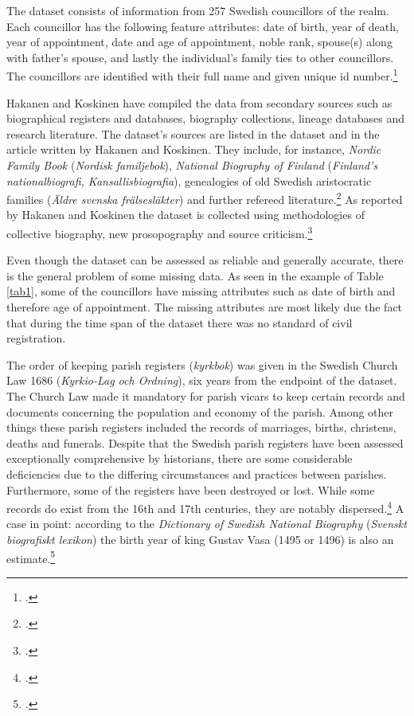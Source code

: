 The dataset consists of information from 257 Swedish councillors of the realm. Each councillor has the following feature attributes: date of birth, year of death, year of appointment, date and age of appointment, noble rank, spouse(s) along with father's spouse, and lastly the individual's family ties to other councillors. The councillors are identified with their full name and given unique id number.\footcites[p. 48.]{HakanenAKoskinen2017}{councillorsDS}

Hakanen and Koskinen have compiled the data from secondary sources such as biographical registers and databases, biography collections, lineage databases and research literature. The dataset's sources are listed in the dataset and in the article written by Hakanen and Koskinen. They include, for instance, \textit{Nordic Family Book} (\textit{Nordisk familjebok}), \textit{National Biography of Finland} (\textit{Finland's nationalbiografi, Kansallisbiografia}), genealogies of old Swedish aristocratic families (\textit{Äldre svenska frälsesläkter}) and further refereed literature.\footcites[p. 48, 76]{HakanenAKoskinen2017}{councillorsDS} As reported by Hakanen and Koskinen the dataset is collected using methodologies of collective biography, new prosopography and source criticism.\footcite[p. 48.]{HakanenAKoskinen2017}
  
Even though the dataset can be assessed as reliable and generally accurate, there is the general problem of some missing data. As seen in the example of Table \ref{tab1}, some of the councillors have missing attributes such as date of birth and therefore age of appointment. The missing attributes are most likely due the fact that during the time span of the dataset there was no standard of civil registration. 

The order of keeping parish registers (\textit{kyrkbok}) was given in the Swedish Church Law 1686 (\textit{Kyrkio-Lag och Ordning}), six years from the endpoint of the dataset. The Church Law made it mandatory for parish vicars to keep certain records and documents concerning the population and economy of the parish. Among other things these parish registers included the records of marriages, births, christens, deaths and funerals. Despite that the Swedish parish registers have been assessed exceptionally comprehensive by historians, there are some considerable deficiencies due to the differing circumstances and practices between parishes. Furthermore, some of the registers have been destroyed or lost. While some records do exist from the 16th and 17th centuries, they are notably dispersed.\footcite[pp. 169-176.]{viikki94} A case in point: according to the \textit{Dictionary of Swedish National Biography} (\textit{Svenskt biografiskt lexikon}) the birth year of king Gustav Vasa (1495 or 1496) is also an estimate.\footcite{sbl_gustav_v}

